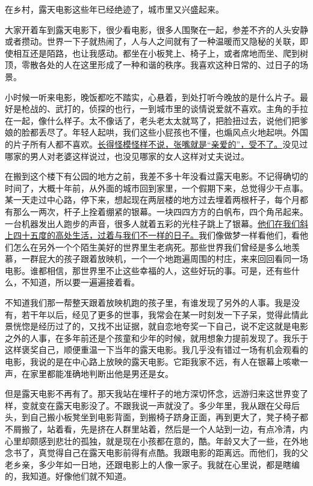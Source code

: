 \documentclass[11pt,a4paper]{ctexart}
\begin{document}
\begin{materialtext}
在乡村，露天电影这些年已经绝迹了，城市里又兴盛起来。

大家开着车到露天电影下，很少看电影，很多人围聚在一起，参差不齐的人头安静或者攒动。世界一下子就热闹了，人与人之间就有了一种温暖而又隐秘的关联，即使相互还是陌路，也让我感动。都坐在小板凳上、椅子上，或者席地而坐、爬到树顶，零散各处的人在这里形成了一种和谐的秩序。我喜欢这种日常的、过日子的场景。

小时候一听来电影，晚饭都吃不踏实，心悬着，到处打听今晚放的是什么片子。最好是枪战的、武打的，侦探的也行，一到城市里的谈情说爱就不喜欢。主角的手拉在一起，像什么样子。太不像话了，老头老太太就骂了，把脸扭过去，说他们把爹娘的脸都丢尽了。年轻人起哄，我们这些小屁孩也不懂，也煽风点火地起哄。外国的片子所有人都不喜欢。\uline{长得怪模怪样不说，张嘴就是“亲爱的”，受不了。}没见过哪家的男人对老婆这样说过，也没见哪家的女人这样对丈夫说过。

在搬到这个楼下有公园的地方之前，我差不多十年没看过露天电影。不记得确切的时间了，大概十年前，从外面的城市回到家里，一个假期下来，总觉得少干点事。某一天走过中心路，停下来，想起现在两层楼的地方过去埋着两根杆子，每个月都有那么一两次，杆子上拴着绷紧的银幕。一块四四方方的白帆布，四个角吊起来。一台机器发出人跑步的声音，很多人就着五彩的光柱子跳上了银幕。\uline{他们在我们斜上四十五度的高处生活，过着与我们不一样的日子。}我们像做梦一样看他们，看他们怎么在另外一个个陌生美好的世界里生老病死。那些世界我们曾经是多么地羡慕，一群屁大的孩子跟着放映机，一个一个地跑遍周围的村庄，来来回回看同一场电影。谁都相信，那世界里不止这些幸福的人，这些好玩的事。可是，还有些什么，不知道，所以要一遍遍接着看。

不知道我们那一帮整天跟着放映机跑的孩子里，有谁发现了另外的人事。我是没有，若干年以后，经见了更多的世事，我常会在某一时刻发一下子呆，觉得此情此景恍惚是经历过了的，又找不出证据，就自恋地夸奖一下自己，说不定这就是电影之外的人事，在多年前还是个孩童和少年的时候，就用想象力提前发现了。我乐于这样褒奖自己，顺便重温一下当年的露天电影。我几乎没有错过一场有机会观看的电影，我说的是在中心路上放映的露天电影。它距我家不远，有人在银幕上咳嗽一声，在家里都能准确地判断出他是男还是女。

但是露天电影不再有了。那天我站在埋杆子的地方深切怀念，远游归来这世界变了样，变就变在露天电影没了。不跟我说一声就没了。多少年里，我从跟在父母后头，到自己搬小板凳坐到电影背面，到搬椅子跻身正面，再到更大了，凳子椅子都不屑搬了，站着看，先是挤在人群里站着，然后是一个人站到一边，有点冷清，内心里却颇感到悲壮的孤独，就是现在小孩都在意的，酷。年龄又大了一些，在外地念书了，真觉得自己在露天电影前得有点酷。我跟电影的距离远。而他们，我的父老乡亲，多少年如一日地，还跟电影上的人像一家子。我就在心里说，都是瞎编的，我知道。好像他们就不知道。


\end{materialtext}
\end{document}
